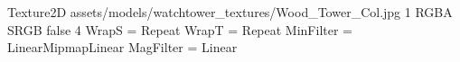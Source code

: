 Texture2D
assets/models/watchtower_textures/Wood_Tower_Col.jpg
1
RGBA
SRGB
false
4
WrapS = Repeat
WrapT = Repeat
MinFilter = LinearMipmapLinear
MagFilter = Linear
